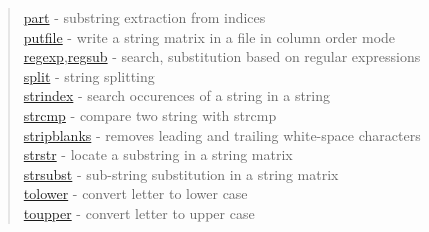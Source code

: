 \begin{quote}
\hyperlink{part}{part} - substring extraction from indices\\
\hyperlink{putfile}{putfile} - write a string matrix in a file in column order mode \\
\hyperlink{regexp}{regexp},\hyperlink{regsub}{regsub} - search, substitution based on regular expressions\\
\hyperlink{split}{split} - string splitting\\
\hyperlink{strindex}{strindex} - search occurences of a string in a string\\
\hyperlink{strcmp}{strcmp} - compare two string with strcmp \\
\hyperlink{stripblanks}{stripblanks} - removes leading and trailing white-space characters\\
\hyperlink{strstr}{strstr} - locate a substring in a string matrix\\
\hyperlink{strsubst}{strsubst} - sub-string substitution in a string matrix\\
\hyperlink{tolower}{tolower} - convert letter to lower case\\
\hyperlink{toupper}{toupper} - convert letter to upper case
\end{quote}




















